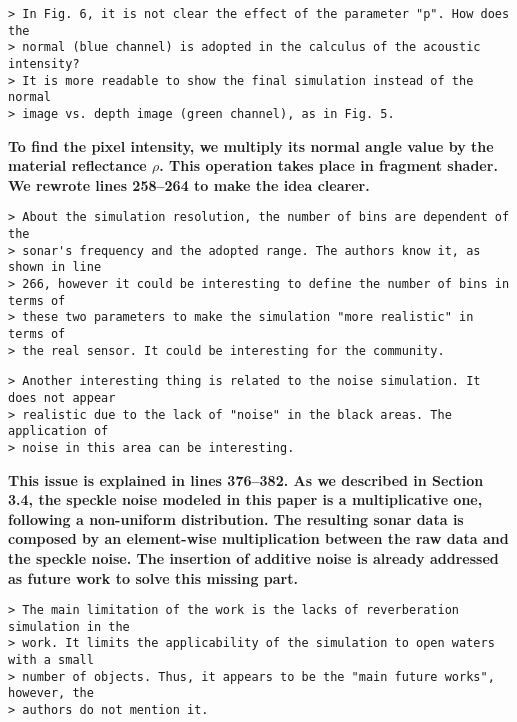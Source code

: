 \documentclass{article}
\begin{document}
\begin{verbatim}
> In Fig. 6, it is not clear the effect of the parameter "p". How does the
> normal (blue channel) is adopted in the calculus of the acoustic intensity?
> It is more readable to show the final simulation instead of the normal
> image vs. depth image (green channel), as in Fig. 5.
\end{verbatim}

\textbf{To find the pixel intensity, we multiply its normal angle value by the
material reflectance $\rho$. This operation takes place in fragment shader.
We rewrote lines 258--264 to make the idea clearer. }

\begin{verbatim}
> About the simulation resolution, the number of bins are dependent of the
> sonar's frequency and the adopted range. The authors know it, as shown in line
> 266, however it could be interesting to define the number of bins in terms of
> these two parameters to make the simulation "more realistic" in terms of
> the real sensor. It could be interesting for the community.
\end{verbatim}


\begin{verbatim}
> Another interesting thing is related to the noise simulation. It does not appear
> realistic due to the lack of "noise" in the black areas. The application of
> noise in this area can be interesting.
\end{verbatim}

\textbf{This issue is explained in lines 376--382. As we described in
Section 3.4, the speckle noise modeled in this paper is a multiplicative one,
following a non-uniform distribution. The resulting sonar data is composed by
an element-wise multiplication between the raw data and the speckle noise. The
insertion of additive noise is already addressed as future work to solve this
missing part.}

\begin{verbatim}
> The main limitation of the work is the lacks of reverberation simulation in the
> work. It limits the applicability of the simulation to open waters with a small
> number of objects. Thus, it appears to be the "main future works", however, the
> authors do not mention it.
\end{verbatim}
\end{document}
